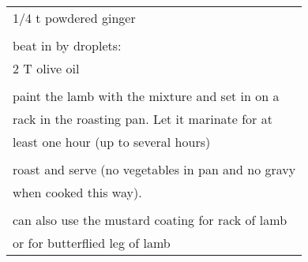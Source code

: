\documentclass[8pt]{report}
\begin{document}
\begin{tabular}{|l|}
\hspace{0.5 in}	1/4 t powdered ginger\\
\\
beat in by droplets:\\
\hspace{0.5 in}	2 T olive oil\\
\\
paint the lamb with the mixture and set in on a\\
rack in the roasting pan.  Let it marinate for at\\
least one hour (up to several hours)\\
\\
roast and serve (no vegetables in pan and no gravy\\
when cooked this way).\\
\\
can also use the mustard coating for rack of lamb\\
or for butterflied leg of lamb\\




\hline

\end{tabular}


\newpage

\centering
\end{document}
